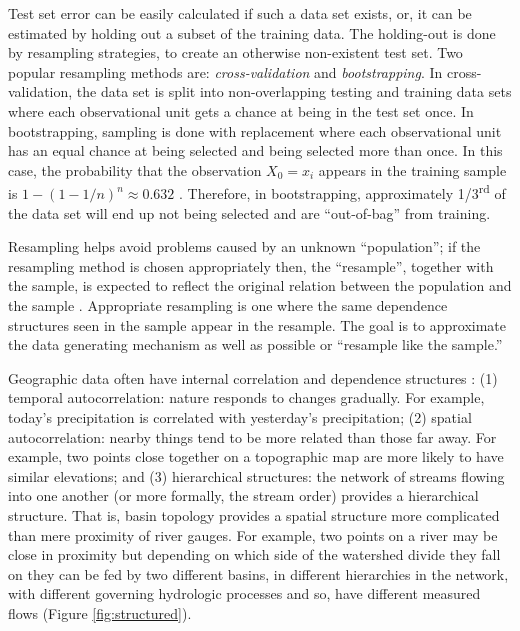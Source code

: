 Test set error can be easily calculated if such a data set exists, or, it can be estimated by holding out a subset of the training data. The holding-out is done by resampling strategies, to create an otherwise non-existent test set. Two popular resampling methods are: \textit{cross-validation} and \textit{bootstrapping}. In cross-validation, the data set is split into non-overlapping testing and training data sets where each observational unit gets a chance at being in the test set once. In bootstrapping, sampling is done with replacement where each observational unit has an equal chance at being selected and being selected more than once. In this case, the probability that the observation $X_0 = x_i$ appears in the training sample is $1- (1 - 1/n)^n \approx 0.632$ \cite{efron1997improvements}. Therefore, in bootstrapping, approximately 1/3\textsuperscript{rd} of the data set will end up not being selected and are ``out-of-bag'' from training. 

Resampling helps avoid problems caused by an unknown ``population''; if the resampling method is chosen appropriately then, the ``resample'', together with the sample, is expected to reflect the original relation between the population and the sample \cite{lahiri2013resampling}. Appropriate resampling is one where the same dependence structures seen in the sample appear in the resample. The goal is to approximate the data generating mechanism as well as possible or ``resample like the sample.'' 

Geographic data often have internal correlation and dependence structures \cite{legendre1993spatial}: (1) temporal autocorrelation: nature responds to changes gradually. For example, today's precipitation is correlated with yesterday's precipitation; (2) spatial autocorrelation: nearby things tend to be more related than those far away. For example, two points close together on a topographic map are more likely to have similar elevations;  and (3) hierarchical structures: the network of streams flowing into one another (or more formally, the stream order) provides a hierarchical structure. That is, basin topology provides a spatial structure more complicated than mere proximity of river gauges. For example, two points on a river may be close in proximity but depending on which side of the watershed divide they fall on they can be fed by two different basins, in different hierarchies in the network, with different governing hydrologic processes and so, have different measured flows (Figure \ref{fig:structured}). 

